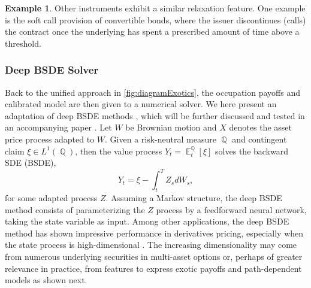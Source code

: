 \documentclass[11pt]{article}
\theoremstyle{plain}
\theoremstyle{definition}
\newtheorem{example}{Example}
\DeclareMathOperator{\E}{\mathbb{E}}
\DeclareMathOperator{\Q}{\mathbb{Q}}
\begin{document}
\begin{example}
Other instruments exhibit a similar relaxation feature. 
One example is the soft call provision of convertible bonds, where  the issuer  discontinues (calls) the contract once the underlying has spent a prescribed amount of time above a  threshold. %
\end{example}


\subsubsection{Deep BSDE Solver}\label{sec:PDE}%
%

Back to the unified approach  in \cref{fig:diagramExotics}, the occupation payoffs and calibrated model are then given to a numerical solver. We here present an adaptation of deep BSDE methods \cite{HanJentzenE1,HanJentzenE2,hure2020deep}, which will be further discussed and tested in an accompanying paper \cite{HuangTissotZhang}. %
Let $W$ be Brownian motion and $X$ denotes the asset price process  adapted to  $W$. Given a risk-neutral measure $\Q$ and contingent claim   $\xi  \in L^1(\Q)$, then the value process $Y_t = \E^{\Q}_t[\xi]$ solves the backward SDE (BSDE),  
\begin{equation}\label{eq:BSDE1}
    Y_t= \xi -  \int_t^T Z_sdW_s,
\end{equation}
for some adapted process $Z$. Assuming  a Markov structure, the  deep BSDE method  consists of parameterizing the $Z$ process by a feedforward neural network,  taking the state variable as input.  Among other applications, the deep BSDE method has shown impressive performance in derivatives pricing, especially when the state process is high-dimensional \cite{HanJentzenE1,HanJentzenE2,hure2020deep}. The increasing dimensionality may come from  numerous underlying securities in multi-asset options or, perhaps of greater relevance in practice, from features to express exotic payoffs and path-dependent models as shown next. 
\end{document}
